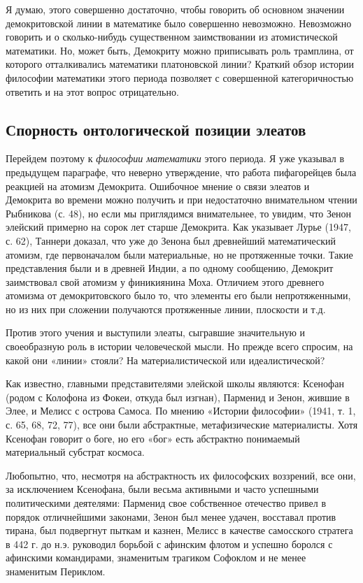 Я  думаю,  этого совершенно  достаточно,  чтобы  говорить об  основном
значении демокритовской линии в математике было совершенно невозможно.
Невозможно говорить  и о сколько-нибудь существенном  заимствовании из
атомистической математики. Но, может быть, Демокриту можно приписывать
роль  трамплина,  от  которого отталкивались  математики  платоновской
линии?  Краткий  обзор  истории  философии  математики  этого  периода
позволяет  с совершенной  категоричностью  ответить и  на этот  вопрос
отрицательно.

\subsection{Спорность онтологической позиции элеатов}

Перейдем  поэтому  к  \emph{философии  математики}  этого  периода.  Я
уже  указывал в  предыдущем  параграфе, что  неверно утверждение,  что
работа  пифагорейцев была  реакцией  на  атомизм Демокрита.  Ошибочное
мнение о  связи элеатов и  Демокрита во  времени можно получить  и при
недостаточно  внимательном  чтении  Рыбникова  (с.  48),  но  если  мы
приглядимся внимательнее,  то увидим,  что Зенон элейский  примерно на
сорок  лет  старше  Демокрита.  Как указывает  Лурье  (1947,  с.  62),
Таннери  доказал,  что уже  до  Зенона  был древнейший  математический
атомизм, где первоначалом были  материальные, но не протяженные точки.
Такие представления  были и  в древней Индии,  а по  одному сообщению,
Демокрит заимствовал  свой атомизм у финикиянина  Моха. Отличием этого
древнего атомизма  от демокритовского было  то, что элементы  его были
непротяженными, но  из них при сложении  получаются протяженные линии,
плоскости и т.д.

Против  этого  учения и  выступили  элеаты,  сыгравшие значительную  и
своеобразную  роль  в  истории  человеческой мысли.  Но  прежде  всего
спросим,  на  какой  они  «линии» стояли?  На  материалистической  или
идеалистической?

Как  известно,  главными   представителями  элейской  школы  являются:
Ксенофан (родом  с Колофона из  Фокеи, откуда был изгнан),  Парменид и
Зенон, жившие  в Элее, и Мелисс  с острова Самоса. По  мнению «Истории
философии» (1941, т. 1, с. 65,  68, 72, 77), все они были абстрактные,
метафизические  материалисты. Хотя  Ксенофан  говорит о  боге, но  его
«бог» есть абстрактно понимаемый материальный субстрат космоса.

Любопытно, что,  несмотря на  абстрактность их  философских воззрений,
все  они, за  исключением  Ксенофана, были  весьма  активными и  часто
успешными политическими деятелями: Парменид свое собственное отечество
привел  в  порядок  отличнейшими  законами, Зенон  был  менее  удачен,
восставал  против тирана,  был подвергнут  пыткам и  казнен, Мелисс  в
качестве  самосского стратега  в 442  г. до  н.э. руководил  борьбой с
афинским флотом и успешно  боролся с афинскими командирами, знаменитым
трагиком Софоклом и не менее знаменитым Периклом.

